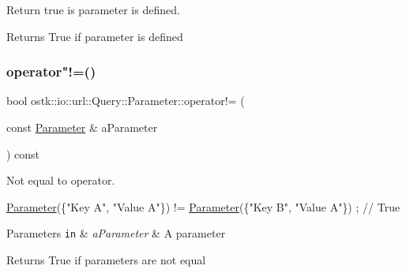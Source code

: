 Return true is parameter is defined. 

\begin{DoxyReturn}{Returns}
True if parameter is defined 
\end{DoxyReturn}
\mbox{\label{classostk_1_1io_1_1url_1_1_query_1_1_parameter_a0e272f97e1f7cefee01a2d8f1af76481}} 
\subsubsection{\texorpdfstring{operator"!=()}{operator!=()}}
{\footnotesize\ttfamily bool ostk\+::io\+::url\+::\+Query\+::\+Parameter\+::operator!= (\begin{DoxyParamCaption}\item[{const \hyperlink{classostk_1_1io_1_1url_1_1_query_1_1_parameter}{Parameter} \&}]{a\+Parameter }\end{DoxyParamCaption}) const}



Not equal to operator. 


\begin{DoxyCode}
\hyperlink{classostk_1_1io_1_1url_1_1_query_1_1_parameter_a0206a88a6546df8ec49219db4a8db3f3}{Parameter}(\{\textcolor{stringliteral}{"Key A"}, \textcolor{stringliteral}{"Value A"}\}) != \hyperlink{classostk_1_1io_1_1url_1_1_query_1_1_parameter_a0206a88a6546df8ec49219db4a8db3f3}{Parameter}(\{\textcolor{stringliteral}{"Key B"}, \textcolor{stringliteral}{"Value A"}\}) ; \textcolor{comment}{// True}
\end{DoxyCode}



\begin{DoxyParams}[1]{Parameters}
\mbox{\tt in}  & {\em a\+Parameter} & A parameter \\
\hline
\end{DoxyParams}
\begin{DoxyReturn}{Returns}
True if parameters are not equal 
\end{DoxyReturn}
\mbox{\label{classostk_1_1io_1_1url_1_1_query_1_1_parameter_a2ff2a7edfc87748ab3fae225b4462a1d}} 
